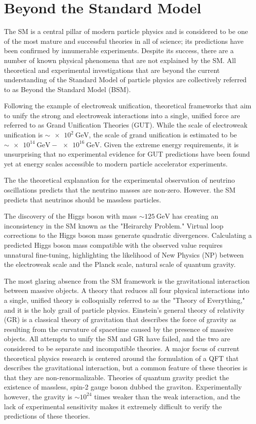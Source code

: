 \section{Beyond the Standard Model}
The SM is a central pillar of modern particle physics and is considered to be one of the most mature and successful theories in all of science; its predictions have been confirmed by innumerable experiments.
Despite its success, there are a number of known physical phenomena that are not explained by the SM.
All theoretical and experimental investigations that are beyond the current understanding of the Standard Model of particle physics are collectively referred to as Beyond the Standard Model (BSM).

Following the example of electroweak unification, theoretical frameworks that aim to unify the strong and electroweak interactions into a single, unified force are referred to as Grand Unification Theories (GUT).
While the scale of electroweak unification is $\sim \SI{e2}{\GeV}$, the scale of grand unification is estimated to be $\sim \SI{e14}{\GeV} - \SI{e16}{\GeV}$.
Given the extreme energy requirements, it is unsurprising that no experimental evidence for GUT predictions have been found yet at energy scales accessible to modern particle accelerator experiments.

The the theoretical explanation for the experimental observation of neutrino oscillations predicts that the neutrino masses are non-zero.
However. the SM predicts that neutrinos should be massless particles. 

The discovery of the Higgs boson with mass $\sim \SI{125}{\GeV}$ has creating an inconsistency in the SM known as the "Heirarchy Problem."
Virtual loop corrections to the Higgs boson mass generate quadratic divergences.
Calculating a predicted Higgs boson mass compatible with the observed value requires unnatural fine-tuning, highlighting the likelihood of New Physics (NP) between the electroweak scale and the Planck scale, natural scale of quantum gravity.

The most glaring absence from the SM framework is the gravitational interaction between massive objects.
A theory that reduces all four physical interactions into a single, unified theory is colloquially referred to as the "Theory of Everything," and it is the holy grail of particle physics.
Einstein's general theory of relativity (GR) is a classical theory of gravitation that describes the force of gravity as resulting from the curvature of spacetime caused by the presence of massive objects.
All attempts to unify the SM and GR have failed, and the two are considered to be separate and incompatible theories.
A major focus of current theoretical physics research is centered around the formulation of a QFT that describes the gravitational interaction, but a common feature of these theories is that they are non-renormalizable.
Theories of quantum gravity predict the existence of massless, spin-2 gauge boson dubbed the graviton.
Experimentally however, the gravity is $\sim 10^{24}$ times weaker than the weak interaction, and the lack of experimental sensitivity makes it extremely difficult to verify the predictions of these theories.

